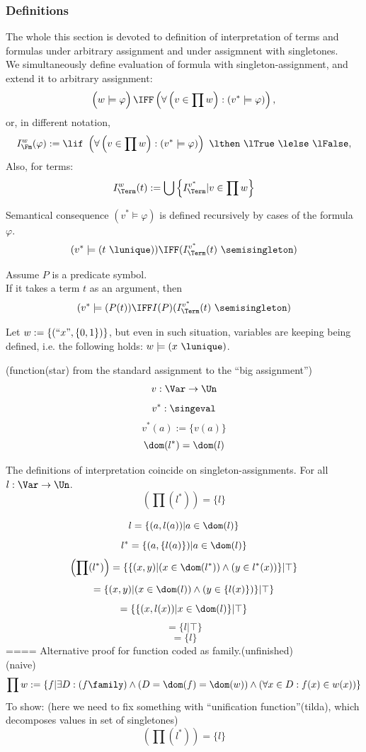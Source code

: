 \subsubsection{Definitions}
The whole this section is devoted to definition of interpretation of terms and formulas under arbitrary assignment and under assigmnent with singletones.\\
We simultaneously define evaluation of formula with singleton-assignment, and extend it to arbitrary assignment:
\[
\left(w\models\varphi\vphantom\prod\right)\IFF
\left(\forall \left(v\in\prod w\right):
\left(v^*\models\varphi\right)\right),
\]
or, in  different notation,
\[
I^w_\Fm(\varphi):=
\lif
\ \left(
\forall \left(v\in\prod w\right):
\left(v^*\models\varphi\right)
\right)
\ \lthen
\ \lTrue
\ \lelse
\ \lFalse,
\]
Also, for terms:
\[
I^w_\Term(t):=
\bigcup \left\{ I^{v^*}_\Term 
|v\in\prod w\right\}
\]

Semantical consequence $\left(v^*\models\varphi\right)$ is defined recursively by cases of the formula $\varphi$.
\[
(v^*\models(t\ \lunique))\IFF (I^{v^*}_\Term(t)\ \semisingleton)
\]

Assume $P$ is a predicate symbol.\\
If it takes a term $t$ as an argument, then
\[
(v^*\models(P(t))\IFF I(P)(I^{v^*}_\Term(t)\ \semisingleton)
\]
\begin{example*}
Let $w:=\{(``x",\{0,1\})\}$, but even in such situation, variables are keeping being defined, i.e. the following holds: $w\models(x\ \lunique)$.
\end{example*}

\begin{definition}(function(star) from the standard assignment to the ``big assignment'')
\[
v:\Var\to\Un
\]
\[
v^*:\singeval
\]
\[
v^*(a):=\{v(a)\}
\]
\[
\dom(l^*)=\dom(l)
\]
\end{definition}

\begin{theorem}
The definitions of interpretation coincide on singleton-assignments.
For all $l:\Var\to\Un$.
\[
\left(\prod (l^*)\right)=\{l\}
\]
\end{theorem}
\Proof
\[
l=\{(a,l(a))|a\in\dom(l)\}
\]
\[
l^*=\{(a,\{l(a)\})|a\in\dom(l)\}
\]
\[
\left(\prod (l^*)\right)=
\{\{(x,y)|(x\in \dom(l^*)) \land (y\in l^*(x))\}|\top\}
\]
\[
=\{(x,y)|(x\in \dom(l)) \land (y\in \{l(x)\})\}|\top\}
\]
\[
=\{\{(x,l(x))|x\in\dom(l)\}|\top\}
\]
\[
=\{l|\top\}
\]
\[
=\{l\}
\]
\iftrue
==== Alternative proof for function coded as family.(unfinished)\\
(naive)
\[
\prod w := \{f | \exists D: (f\family) \land (D = \dom(f)=\dom(w)) \land (\forall x\in D: f(x) \in w(x)) \}
\]
To show: (here we need to fix something with ``unification function''(tilda), which decomposes values in set of singletones)
\[
\left(\prod (l^*)\right)=\{l\}
\]

